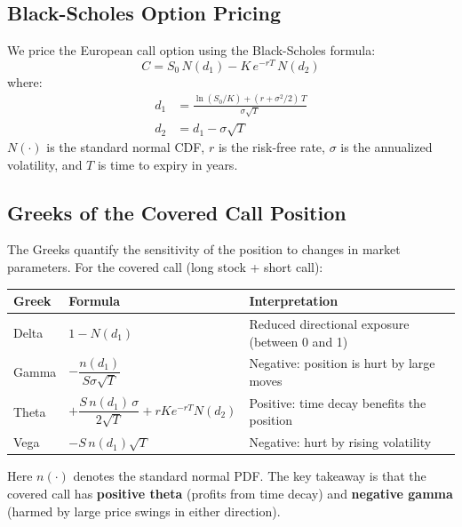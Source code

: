 \documentclass[12pt, a4paper]{article}
\begin{document}
\subsection{Black-Scholes Option Pricing}

We price the European call option using the Black-Scholes formula:
\begin{equation}
    C = S_0 \, N(d_1) - K \, e^{-rT} \, N(d_2)
\end{equation}
where:
\begin{align}
    d_1 &= \frac{\ln(S_0 / K) + (r + \sigma^2/2) \, T}{\sigma \sqrt{T}} \\[6pt]
    d_2 &= d_1 - \sigma \sqrt{T}
\end{align}
$N(\cdot)$ is the standard normal CDF, $r$ is the risk-free rate, $\sigma$ is the annualized volatility, and $T$ is time to expiry in years.

\subsection{Greeks of the Covered Call Position}

The Greeks quantify the sensitivity of the position to changes in market parameters. For the covered call (long stock + short call):

\begin{center}
\small
\begin{tabular}{p{1.7cm} p{5.2cm} p{5.0cm}}
    \toprule
    \textbf{Greek} & \textbf{Formula} & \textbf{Interpretation} \\
    \midrule
    Delta & $1 - N(d_1)$ & Reduced directional exposure (between 0 and 1) \\
    Gamma & $-\dfrac{n(d_1)}{S \sigma \sqrt{T}}$ & Negative: position is hurt by large moves \\[8pt]
    Theta & $+\dfrac{S \, n(d_1) \, \sigma}{2\sqrt{T}} + r K e^{-rT} N(d_2)$ & Positive: time decay benefits the position \\[8pt]
    Vega & $-S \, n(d_1) \sqrt{T}$ & Negative: hurt by rising volatility \\
    \bottomrule
\end{tabular}
\end{center}
\normalsize

Here $n(\cdot)$ denotes the standard normal PDF. The key takeaway is that the covered call has \textbf{positive theta} (profits from time decay) and \textbf{negative gamma} (harmed by large price swings in either direction).
\end{document}
